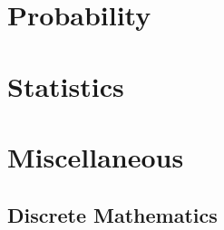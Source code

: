 \documentclass[oneside]{book}
\numberwithin{equation}{section}
\begin{document}

\chapter{Probability}


\chapter{Statistics}





\chapter{Miscellaneous}

\section{Discrete Mathematics}
\end{document}
